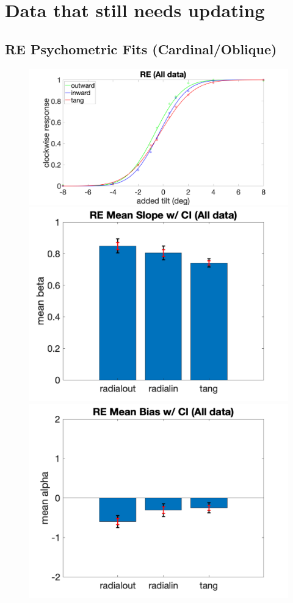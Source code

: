 \documentclass[11pt]{article} %
\begin{document}
\newpage
\section{Data that still needs updating}
\subsection{RE Psychometric Fits (Cardinal/Oblique)}
\begin{figure}[H]
\centering %
\includegraphics[scale=.06]{Images/PF_RE_allcond.png}
\includegraphics[scale=.11]{Images/MeanSlopeError_ci_RE_allcond.png}
\includegraphics[scale=.11]{Images/MeanBiasError_ci_RE_allcond.png}

\end{figure}
\end{document}
